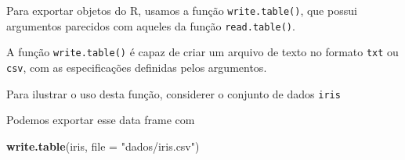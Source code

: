 \documentclass[10pt,a4paper]{book}
\newenvironment{Shaded}{\begin{snugshade}}{\end{snugshade}}
\newcommand{\KeywordTok}[1]{\textcolor[rgb]{0.13,0.29,0.53}{\textbf{#1}}}
\newcommand{\DataTypeTok}[1]{\textcolor[rgb]{0.13,0.29,0.53}{#1}}
\newcommand{\DecValTok}[1]{\textcolor[rgb]{0.00,0.00,0.81}{#1}}
\newcommand{\FloatTok}[1]{\textcolor[rgb]{0.00,0.00,0.81}{#1}}
\newcommand{\StringTok}[1]{\textcolor[rgb]{0.31,0.60,0.02}{#1}}
\newcommand{\OperatorTok}[1]{\textcolor[rgb]{0.81,0.36,0.00}{\textbf{#1}}}
\newcommand{\ErrorTok}[1]{\textcolor[rgb]{0.64,0.00,0.00}{\textbf{#1}}}
\newcommand{\NormalTok}[1]{#1}
\begin{document}
Para exportar objetos do R, usamos a função \texttt{write.table()}, que
possui argumentos parecidos com aqueles da função \texttt{read.table()}.

A função \texttt{write.table()} é capaz de criar um arquivo de texto no
formato \texttt{txt} ou \texttt{csv}, com as especificações definidas
pelos argumentos.

Para ilustrar o uso desta função, considerer o conjunto de dados
\texttt{iris}

\begin{Shaded}
\end{Shaded}

Podemos exportar esse data frame com

\begin{Shaded}
\begin{Highlighting}[]
\KeywordTok{write.table}\NormalTok{(iris, }\DataTypeTok{file =} \StringTok{"dados/iris.csv"}\NormalTok{)}
\end{Highlighting}
\end{Shaded}
\end{document}
